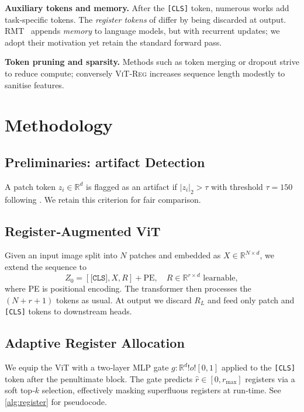 \documentclass{article}
\newcommand{\ours}{\textsc{ViT‑Reg}\xspace}
\newcommand{\nreg}{r}
\newcommand{\citet}{\textcite}
\begin{document}
\textbf{Auxiliary tokens and memory.}  After the \texttt{[CLS]} token, numerous works add task‑specific tokens.  The \emph{register tokens} of \citet{darcetVisionTransformersNeed2024} differ by being discarded at output.  RMT~\cite{bulatovRecurrentMemoryTransformer2022} appends \emph{memory} to language models, but with recurrent updates; we adopt their motivation yet retain the standard forward pass.

\textbf{Token pruning and sparsity.}  Methods such as token merging or dropout strive to reduce compute; conversely \ours increases sequence length modestly to sanitise features.

\section{Methodology}
\label{sec:method}
\subsection{Preliminaries: artifact Detection}
A patch token $z_i\in\mathbb R^d$ is flagged as an artifact if $|z_i|_2 > \tau$ with threshold $\tau=150$ following \citet{darcetVisionTransformersNeed2024}.  We retain this criterion for fair comparison.

\subsection{Register‑Augmented ViT}
Given an input image split into $N$ patches and embedded as $X\in\mathbb R^{N\times d}$, we extend the sequence to
\begin{equation}
Z_0 = [\texttt{[CLS]}, X, R] + \text{PE}, \quad R\in\mathbb R^{\nreg\times d}\text{ learnable},
\end{equation}
where PE is positional encoding.  The transformer then processes the $(N{+}\nreg{+}1)$ tokens as usual.  At output we discard $R_L$ and feed only patch and \texttt{[CLS]} tokens to downstream heads.

\subsection{Adaptive Register Allocation}
We equip the ViT with a two‑layer MLP gate $g:\mathbb R^{d}!	o![0,1]$ applied to the \texttt{[CLS]} token after the penultimate block.  The gate predicts $\hat{\nreg}\in [0,\nreg_{\max}]$ registers via a soft top‑$k$ selection, effectively masking superfluous registers at run‑time.  See \cref{alg:register} for pseudocode.
\end{document}
